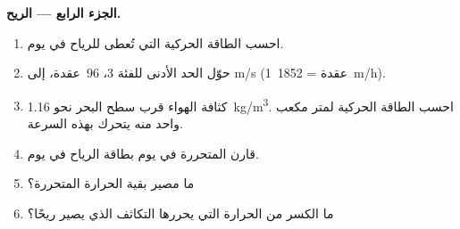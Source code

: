 \begin{problem}
\medskip
\noindent\textbf{الجزء الرابع --- الريح.}
\begin{enumerate}[resume]
  \item احسب الطاقة الحركية التي تُعطى للرياح في يوم.
  \item حوّل الحد الأدنى للفئة 3، \num{96}~عقدة، إلى
        \unit{m/s} (\num{1}~عقدة = \qty{1852}{m/h}).
  \item كثافة الهواء قرب سطح البحر نحو
        \qty{1.16}{kg/m^3}. احسب الطاقة الحركية لمتر مكعب واحد
        منه يتحرك بهذه السرعة.
  \item قارن  المتحررة في يوم بطاقة الرياح في
        يوم.
  \item ما مصير بقية الحرارة المتحررة؟
  \item ما الكسر من الحرارة التي يحررها التكاثف الذي يصير ريحًا؟
\end{enumerate}
\end{problem}
